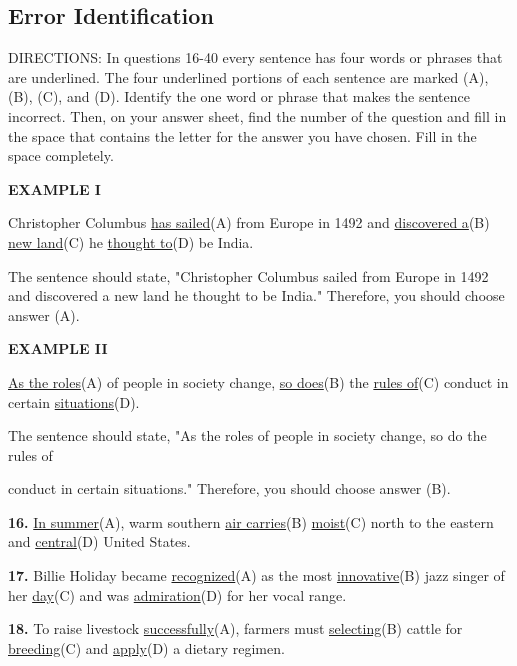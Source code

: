 \documentclass[12pt]{article}
\begin{document}
\subsection*{Error Identification}
DIRECTIONS: In questions 16-40 every sentence has four words or phrases that are underlined. The four underlined portions of each sentence are marked (A), (B), (C), and (D). Identify the one word or phrase that makes the sentence incorrect. Then, on your answer sheet, find the number of the question and fill in the space that contains the letter for the answer you have chosen. Fill in the space completely.\par
\begin{exampleblock}
\textbf{EXAMPLE I}\par
Christopher Columbus \uline{has sailed}(A) from Europe in 1492 and \uline{discovered a}(B) \uline{new land}(C) he \uline{thought to}(D) be India.\par
The sentence should state, "Christopher Columbus sailed from Europe in 1492 and discovered a new land he thought to be India." Therefore, you should choose answer (A).\par
\end{exampleblock}
\begin{exampleblock}
\textbf{EXAMPLE II}\par
\uline{As the roles}(A) of people in society change, \uline{so does}(B) the \uline{rules of}(C) conduct in certain \uline{situations}(D).\par
The sentence should state, "As the roles of people in society change, so do the rules of\par
conduct in certain situations." Therefore, you should choose answer (B).\par
\end{exampleblock}
\noindent\textbf{16.} \uline{In summer}(A), warm southern \uline{air carries}(B) \uline{moist}(C) north to the eastern and \uline{central}(D) United States.
\par
\vspace{\questionblockgap}
\noindent\textbf{17.} Billie Holiday became \uline{recognized}(A) as the most \uline{innovative}(B) jazz singer of her \uline{day}(C) and was \uline{admiration}(D) for her vocal range.
\par
\vspace{\questionblockgap}
\noindent\textbf{18.} To raise livestock \uline{successfully}(A), farmers must \uline{selecting}(B) cattle for \uline{breeding}(C) and \uline{apply}(D) a dietary regimen.
\par
\end{document}
